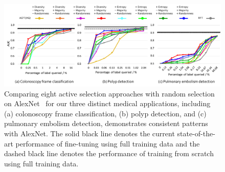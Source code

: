 
\begin{figure}
\begin{center}
\includegraphics[width=1.0\columnwidth]{Figures/CH3/fig_selection_approaches_comparison_alexnet.pdf}
\end{center}
\caption[Assessment of Eight Active Selecting Criteria (AlexNet)]{
Comparing eight active selection approaches with random selection on AlexNet~\citep{krizhevsky2012imagenet} for our three distinct medical applications, including (a) colonoscopy frame classification, (b) polyp detection, and (c) pulmonary embolism detection, demonstrates consistent patterns with AlexNet. The solid black line denotes the current state-of-the-art performance of fine-tuning using full training data and the dashed black line denotes the performance of training from scratch using full training data.}
\label{ch3:fig:selection_approaches_comparison_alexnet}
\end{figure}



